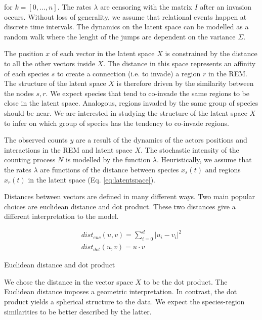 \documentclass[mscthesis]{usiinfthesis}
\begin{document}
for $k = [0, ..., n]$. The rates $\lambda$ are censoring with the matrix $I$ after an invasion occurs. Without loss of generality, we assume that relational events happen at discrete time intervals. The dynamics on the latent space can be modelled as a random walk where the lenght of the jumps are dependent on the variance $\Sigma$.

The position $x$ of each vector in the latent space $X$ is constrained by the distance to all the other vectors inside $X$. The distance in this space represents an affinity of each species $s$ to create a connection (i.e. to invade) a region $r$ in the REM. The structure of the latent space $X$ is therefore driven by the similarity between the nodes $s, r$. We expect species that tend to co-invade the same regions to be close in the latent space. Analogous, regions invaded by the same group of species should be near. We are interested in studying the structure of the latent space $X$ to infer on which group of species has the tendency to co-invade regions.


The observed counts $y$ are a result of the dynamics of the actors positions and interactions in the REM and latent space $X$. The stochastic intensity of the counting process $N$ is modelled by the function $\lambda$. Heuristically, we assume that the rates $\lambda$ are functions of the distance between species $x_s(t)$ and regions $x_r(t)$ in the latent space (Eq. \ref{eq:latentspace}). 

Distances between vectors are defined in many different ways. Two main popular choices are euclidean distance and dot product. These two distances give a different interpretation to the model. 

\begin{eqfloat}
\begin{equation}
\begin{array}{l}
dist_{euc}(u, v) = \sum_{i=0}^d |u_i - v_i|^2 \\
dist_{dot}(u, v) = u \cdot v
\end{array}
\label{eq:distance_latentspace}
\end{equation}
\caption{Euclidean distance and dot product}
\end{eqfloat}

We chose the distance in the vector space $X$ to be the dot product. The Euclidean distance imposes a geometric interpretation. In contrast, the dot product yields a spherical structure to the data. We expect the species-region similarities to be better described by the latter.
\end{document}
